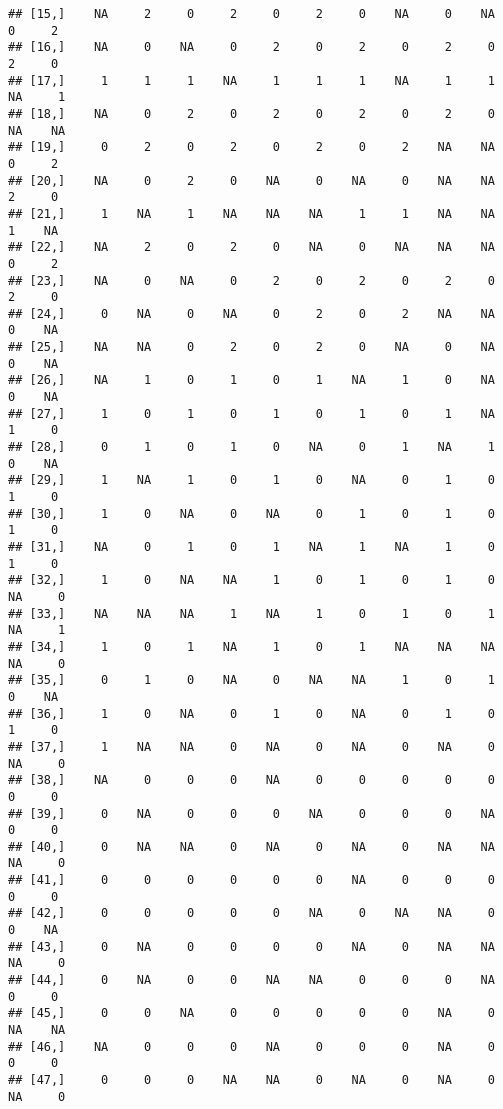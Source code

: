 \documentclass[
]{article}
\begin{document}
\begin{verbatim}
## [15,]    NA     2     0     2     0     2     0    NA     0    NA     0     2
## [16,]    NA     0    NA     0     2     0     2     0     2     0     2     0
## [17,]     1     1     1    NA     1     1     1    NA     1     1    NA     1
## [18,]    NA     0     2     0     2     0     2     0     2     0    NA    NA
## [19,]     0     2     0     2     0     2     0     2    NA    NA     0     2
## [20,]    NA     0     2     0    NA     0    NA     0    NA    NA     2     0
## [21,]     1    NA     1    NA    NA    NA     1     1    NA    NA     1    NA
## [22,]    NA     2     0     2     0    NA     0    NA    NA    NA     0     2
## [23,]    NA     0    NA     0     2     0     2     0     2     0     2     0
## [24,]     0    NA     0    NA     0     2     0     2    NA    NA     0    NA
## [25,]    NA    NA     0     2     0     2     0    NA     0    NA     0    NA
## [26,]    NA     1     0     1     0     1    NA     1     0    NA     0    NA
## [27,]     1     0     1     0     1     0     1     0     1    NA     1     0
## [28,]     0     1     0     1     0    NA     0     1    NA     1     0    NA
## [29,]     1    NA     1     0     1     0    NA     0     1     0     1     0
## [30,]     1     0    NA     0    NA     0     1     0     1     0     1     0
## [31,]    NA     0     1     0     1    NA     1    NA     1     0     1     0
## [32,]     1     0    NA    NA     1     0     1     0     1     0    NA     0
## [33,]    NA    NA    NA     1    NA     1     0     1     0     1    NA     1
## [34,]     1     0     1    NA     1     0     1    NA    NA    NA    NA     0
## [35,]     0     1     0    NA     0    NA    NA     1     0     1     0    NA
## [36,]     1     0    NA     0     1     0    NA     0     1     0     1     0
## [37,]     1    NA    NA     0    NA     0    NA     0    NA     0    NA     0
## [38,]    NA     0     0     0    NA     0     0     0     0     0     0     0
## [39,]     0    NA     0     0     0    NA     0     0     0    NA     0     0
## [40,]     0    NA    NA     0    NA     0    NA     0    NA    NA    NA     0
## [41,]     0     0     0     0     0     0    NA     0     0     0     0     0
## [42,]     0     0     0     0     0    NA     0    NA    NA     0     0    NA
## [43,]     0    NA     0     0     0     0    NA     0    NA    NA    NA     0
## [44,]     0    NA     0     0    NA    NA     0     0     0    NA     0     0
## [45,]     0     0    NA     0     0     0     0     0    NA     0    NA    NA
## [46,]    NA     0     0     0    NA     0     0     0    NA     0     0     0
## [47,]     0     0     0    NA    NA     0    NA     0    NA     0    NA     0

\end{verbatim}
\end{document}
